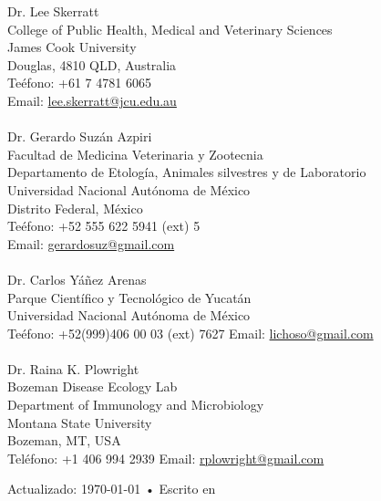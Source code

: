 \documentclass[11pt, letter]{article}
\begin{document}
Dr. Lee Skerratt\\
College of Public Health, Medical and Veterinary Sciences \\
James Cook University\\
Douglas, 4810 QLD, Australia\\
Te\'efono: +61 7 4781 6065\\
Email: \href{mailto:lee.skerratt@jcu.edu.au}{lee.skerratt@jcu.edu.au}\\
\\
Dr. Gerardo Suz\'an Azpiri\\
Facultad de Medicina Veterinaria y Zootecnia\\
Departamento de Etolog\'ia, Animales silvestres y de Laboratorio\\
Universidad Nacional Aut\'onoma de M\'exico\\
Distrito Federal, M\'exico\\
Te\'efono: +52 555 622 5941 (ext) 5\\
Email: \href{mailto:gerardosuz@gmail.com}{gerardosuz@gmail.com}\\
\\
Dr. Carlos Yáñez Arenas\\
Parque Científico y Tecnológico de Yucat\'an\\
Universidad Nacional Autónoma de México\\
Te\'efono: +52(999)406 00 03 (ext) 7627
Email:  \href{mailto:lichoso@gmail.com}{lichoso@gmail.com}\\
\\
Dr. Raina K. Plowright\\
Bozeman Disease Ecology Lab\\
Department of Immunology and Microbiology\\
Montana State University\\
Bozeman, MT, USA\\
Tel\'efono: +1 406 994 2939
Email: \href{mailto:rplowright@gmail.com}{rplowright@gmail.com}

\vfill{}
\begin{center}
{\scriptsize  Actualizado: \today\- •\- 
Escrito en %
\XeTeX %
}
\end{center}
\end{document}

